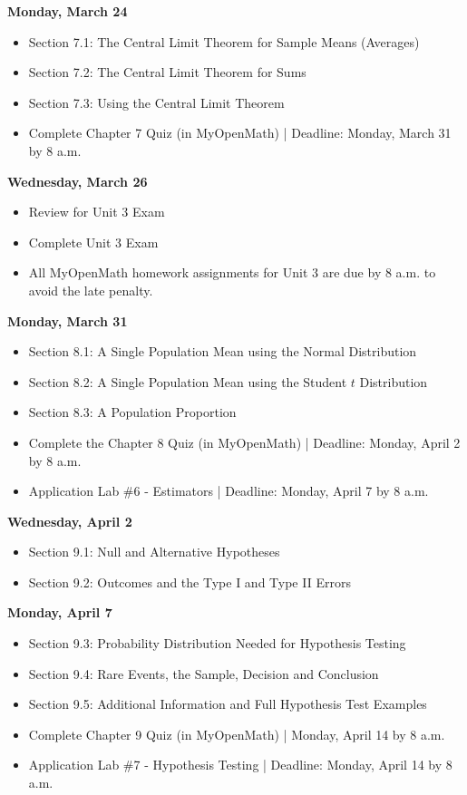 \documentclass[11pt]{article}
\begin{document}
\textbf{Monday, March 24}

\begin{itemize}
\item Section 7.1: The Central Limit Theorem for Sample Means (Averages)
\item Section 7.2: The Central Limit Theorem for Sums
\item Section 7.3: Using the Central Limit Theorem
\item Complete Chapter 7 Quiz (in MyOpenMath) | Deadline: Monday, March 31 by 8 a.m.
\end{itemize}

\textbf{Wednesday, March 26}

\begin{itemize}
\item Review for Unit 3 Exam
\item Complete Unit 3 Exam
\item All MyOpenMath homework assignments for Unit 3 are due by 8 a.m. to avoid the late penalty.
\end{itemize}

\textbf{Monday, March 31}

\begin{itemize}
\item Section 8.1: A Single Population Mean using the Normal Distribution
\item Section 8.2: A Single Population Mean using the Student $t$ Distribution
\item Section 8.3: A Population Proportion
\item Complete the Chapter 8 Quiz (in MyOpenMath) | Deadline: Monday, April 2 by 8 a.m.
\item Application Lab \#6 - Estimators | Deadline: Monday, April 7 by 8 a.m.
\end{itemize}

\textbf{Wednesday, April 2}

\begin{itemize}
\item Section 9.1: Null and Alternative Hypotheses
\item Section 9.2: Outcomes and the Type I and Type II Errors
\end{itemize}

\textbf{Monday, April 7}

\begin{itemize}
\item Section 9.3: Probability Distribution Needed for Hypothesis Testing
\item Section 9.4: Rare Events, the Sample, Decision and Conclusion
\item Section 9.5: Additional Information and Full Hypothesis Test Examples
\item Complete Chapter 9 Quiz (in MyOpenMath) | Monday, April 14 by 8 a.m.
\item Application Lab \#7 - Hypothesis Testing | Deadline:  Monday, April 14 by 8 a.m.
\end{itemize}
\end{document}
